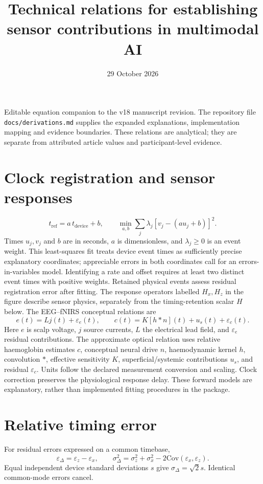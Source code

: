 \documentclass[11pt]{article}
\title{Technical relations for establishing sensor contributions in multimodal AI}
\author{}
\date{29 October 2026}
\begin{document}
\maketitle
\noindent Editable equation companion to the v18 manuscript revision. The
repository file \texttt{docs/derivations.md} supplies the expanded explanations,
implementation mapping and evidence boundaries. These relations are analytical;
they are separate from attributed article values and participant-level evidence.

\section{Clock registration and sensor responses}
\[
t_{\mathrm{ref}}=a\,t_{\mathrm{device}}+b,\qquad
\min_{a,b}\sum_j\lambda_j[v_j-(a u_j+b)]^2.
\]
Times $u_j,v_j$ and $b$ are in seconds, $a$ is dimensionless, and
$\lambda_j\geq0$ is an event weight. This least-squares fit treats device event
times as sufficiently precise explanatory coordinates; appreciable errors in
both coordinates call for an errors-in-variables model. Identifying a rate and
offset requires at least two distinct event times with positive weights. Retained physical
events assess residual registration error after fitting. The response operators
labelled $H_x,H_z$ in the figure describe sensor physics, separately from the
timing-retention scalar $H$ below. The EEG--fNIRS conceptual relations are
\[
e(t)=L j(t)+\varepsilon_e(t),\qquad
c(t)=K[h*n](t)+u_s(t)+\varepsilon_c(t).
\]
Here $e$ is scalp voltage, $j$ source currents, $L$ the electrical lead field,
and $\varepsilon_e$ residual contributions. The approximate optical relation
uses relative haemoglobin estimates $c$, conceptual neural drive $n$,
haemodynamic kernel $h$, convolution $*$, effective sensitivity $K$,
superficial/systemic contributions $u_s$, and residual $\varepsilon_c$.
Units follow the declared measurement conversion and scaling. Clock correction
preserves the physiological response delay. These forward models are explanatory,
rather than implemented fitting procedures in the package.

\section{Relative timing error}
For residual errors expressed on a common timebase,
\[
\varepsilon_\Delta=\varepsilon_z-\varepsilon_x,\qquad
\sigma_\Delta^2=\sigma_z^2+\sigma_x^2
-2\mathrm{Cov}(\varepsilon_x,\varepsilon_z).
\]
Equal independent device standard deviations $s$ give
$\sigma_\Delta=\sqrt{2}s$. Identical common-mode errors cancel.
\end{document}
